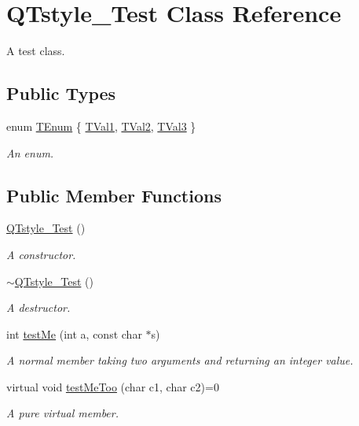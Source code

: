 \hypertarget{classQTstyle__Test}{}\section{Q\+Tstyle\+\_\+\+Test Class Reference}
\label{classQTstyle__Test}


A test class.  


\subsection*{Public Types}
\begin{DoxyCompactItemize}
\item 
enum \hyperlink{classQTstyle__Test_a0525f798cda415a94fedeceb806d2c49}{T\+Enum} \{ \hyperlink{classQTstyle__Test_a0525f798cda415a94fedeceb806d2c49a7929af91f99c319ffe2e49c9632bc3fa}{T\+Val1}, 
\hyperlink{classQTstyle__Test_a0525f798cda415a94fedeceb806d2c49afff89db6859123549579806212d9fd80}{T\+Val2}, 
\hyperlink{classQTstyle__Test_a0525f798cda415a94fedeceb806d2c49a8227cd0f0c1285d59ff14376fcd00f85}{T\+Val3}
 \}\begin{DoxyCompactList}\small\item\em An enum. \end{DoxyCompactList}
\end{DoxyCompactItemize}
\subsection*{Public Member Functions}
\begin{DoxyCompactItemize}
\item 
\hyperlink{classQTstyle__Test_a14a296ea4e2ad446712f2310bec60766}{Q\+Tstyle\+\_\+\+Test} ()
\begin{DoxyCompactList}\small\item\em A constructor. \end{DoxyCompactList}\item 
\hyperlink{classQTstyle__Test_a7e82397d534d9a867f0857da01a46e9e}{$\sim$\+Q\+Tstyle\+\_\+\+Test} ()
\begin{DoxyCompactList}\small\item\em A destructor. \end{DoxyCompactList}\item 
int \hyperlink{classQTstyle__Test_a8840748753118dd468e8368a28e49c62}{test\+Me} (int a, const char $\ast$s)
\begin{DoxyCompactList}\small\item\em A normal member taking two arguments and returning an integer value. \end{DoxyCompactList}\item 
virtual void \hyperlink{classQTstyle__Test_ad5b201f097a720d44bf976c2f27efbda}{test\+Me\+Too} (char c1, char c2)=0
\begin{DoxyCompactList}\small\item\em A pure virtual member. \end{DoxyCompactList}\end{DoxyCompactItemize}
